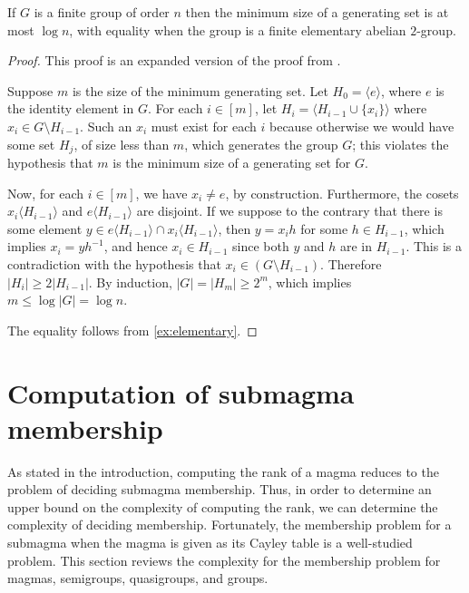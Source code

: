 \documentclass{article}
\newcommand{\todo}[1]{\textbf{TODO #1}}
\newcommand{\gen}[1]{\langle #1 \rangle}
\begin{document}
\begin{lemma}\label{lem:log}
  If $G$ is a finite group of order $n$ then the minimum size of a generating set is at most $\log n$, with equality when the group is a finite elementary abelian $2$-group.
\end{lemma}
\begin{proof}
  This proof is an expanded version of the proof from \autocite{arvind07}.

  Suppose $m$ is the size of the minimum generating set.
  Let $H_0 = \gen{e}$, where $e$ is the identity element in $G$.
  For each $i \in [m]$, let $H_i = \gen{H_{i - 1} \cup \{x_i\}}$ where $x_i \in G \setminus H_{i - 1}$.
  Such an $x_i$ must exist for each $i$ because otherwise we would have some set $H_j$, of size less than $m$, which generates the group $G$; this violates the hypothesis that $m$ is the minimum size of a generating set for $G$.

  Now, for each $i \in [m]$, we have $x_i \neq e$, by construction.
  Furthermore, the cosets $x_i \gen{H_{i - 1}}$ and $e \gen{H_{i - 1}}$ are disjoint.
  If we suppose to the contrary that there is some element $y \in e \gen{H_{i - 1}} \cap x_i \gen{H_{i - 1}}$, then $y = x_i h$ for some $h \in H_{i - 1}$, which implies $x_i = yh^{-1}$, and hence $x_i \in H_{i - 1}$ since both $y$ and $h$ are in $H_{i - 1}$.
  This is a contradiction with the hypothesis that $x_i \in (G \setminus H_{i - 1})$.
  Therefore $|H_i| \geq 2 |H_{i - 1}|$.
  By induction, $|G| = |H_m| \geq 2^m$, which implies $m \leq \log |G| = \log n$.

  The equality follows from \autoref{ex:elementary}.
\end{proof}

\section{Computation of submagma membership}
%
As stated in the introduction, computing the rank of a magma reduces to the problem of deciding submagma membership.
Thus, in order to determine an upper bound on the complexity of computing the rank, we can determine the complexity of deciding membership.
%
Fortunately, the membership problem for a submagma when the magma is given as its Cayley table is a well-studied problem.
This section reviews the complexity for the membership problem for magmas, semigroups, quasigroups, and groups.
\end{document}
